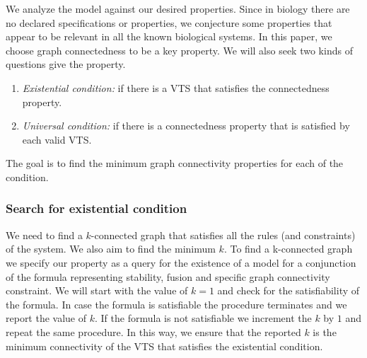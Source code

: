 \noindent We analyze the model against our desired properties.
%
Since in biology there are no declared specifications or properties,
we conjecture some properties that appear to be 
relevant in
all the known
biological systems.
%
In this paper, we choose graph connectedness to be a key property.
%
We will also seek two kinds of questions give the property.
\begin{enumerate}
\item {\em Existential condition:}
if there is a VTS that satisfies the connectedness property. 

\item {\em Universal condition:}
  if there is a connectedness property that is satisfied by each valid VTS.
\end{enumerate}
The goal is to find the minimum graph connectivity properties for each of the condition.
\subsubsection{Search for existential condition} 
%
%
We need to find a $k$-connected graph that satisfies all the rules (and constraints) of the system. 
%
We also aim to find the minimum $k$. 
%
%
To find a k-connected graph we specify our property as a query for the existence
of a model for a conjunction of the formula representing stability, fusion and specific
graph connectivity constraint. 
%
%
We will start with the value of $k = 1$ and check for the satisfiability of the formula.
%
In case the formula is satisfiable the procedure terminates and we report the value of $k$. 
%
If the formula is not satisfiable we increment the $k$ by $1$ and repeat the same procedure. 
%
In this way, we ensure that the reported $k$ is the minimum connectivity of the VTS that
satisfies the existential condition.
%


